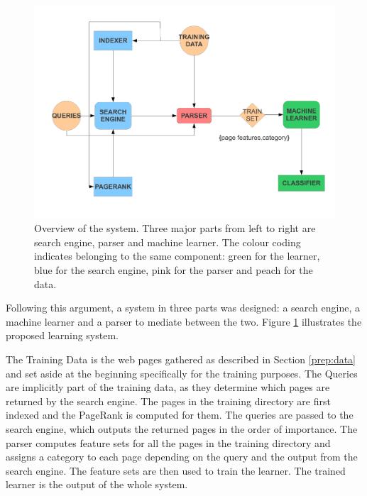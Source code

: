 \documentclass[12pt,a4paper,notitlepage,twoside]{scrbook}
\begin{document}
\begin{figure}[h!]
\centering
\includegraphics[width=\textwidth]{figs/overview.pdf}
\caption{Overview of the system. Three major parts from left to right are search engine,
parser and machine learner. The colour coding indicates belonging to the same component:
green for the learner, blue for the search engine, pink for the parser and peach for the
data.\label{overview}}
\end{figure}
Following this argument, a system in three parts was designed: a search engine, a machine
learner and a parser to mediate between the two. Figure \ref{overview} illustrates the
proposed learning system.

The Training Data is the web pages gathered as described in Section \ref{prep:data} and
set aside at the beginning specifically for the training purposes. The Queries are
implicitly part of the training data, as they determine which pages are returned by the
search engine. The pages in the training directory are first indexed and the PageRank is
computed for them. The queries are passed to the search engine, which outputs the returned
pages in the order of importance. The parser computes feature sets for all the pages in
the training directory and assigns a category to each page depending on the query and the
output from the search engine. The feature sets are then used to train the learner. The
trained learner is the output of the whole system.
\end{document}
